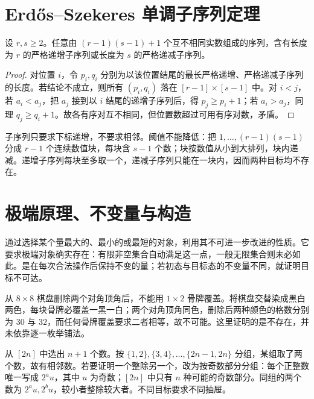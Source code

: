\documentclass[UTF8,12pt,a4paper,fontset=fandol]{ctexbook}
\begin{document}
\section{Erd\H{o}s--Szekeres 单调子序列定理}

\begin{theorem}
设 $r,s\ge2$。任意由 $(r-1)(s-1)+1$ 个互不相同实数组成的序列，含有长度为 $r$ 的严格递增子序列或长度为 $s$ 的严格递减子序列。
\end{theorem}
\begin{proof}
对位置 $i$，令 $p_i,q_i$ 分别为以该位置结尾的最长严格递增、严格递减子序列的长度。若结论不成立，则所有 $(p_i,q_i)$ 落在 $[r-1]\times[s-1]$ 中。对 $i<j$，若 $a_i<a_j$，把 $a_j$ 接到以 $i$ 结尾的递增子序列后，得 $p_j\ge p_i+1$；若 $a_i>a_j$，同理 $q_j\ge q_i+1$。故各有序对互不相同，但位置数超过可用有序对数，矛盾。
\end{proof}

子序列只要求下标递增，不要求相邻。阈值不能降低：把 $1,\ldots,(r-1)(s-1)$ 分成 $r-1$ 个连续数值块，每块含 $s-1$ 个数；块按数值从小到大排列，块内递减。递增子序列每块至多取一个，递减子序列只能在一块内，因而两种目标均不存在。

\section{极端原理、不变量与构造}

通过选择某个量最大的、最小的或最短的对象，利用其不可进一步改进的性质。它要求极端对象确实存在：有限非空集合自动满足这一点，一般无限集合则未必如此。是在每次合法操作后保持不变的量；若初态与目标态的不变量不同，就证明目标不可达。

\begin{example}[棋盘染色]
从 $8\times8$ 棋盘删除两个对角顶角后，不能用 $1\times2$ 骨牌覆盖。将棋盘交替染成黑白两色，每块骨牌必覆盖一黑一白；两个对角顶角同色，删除后两种颜色的格数分别为 $30$ 与 $32$，而任何骨牌覆盖要求二者相等，故不可能。这里证明的是不存在，并未依靠逐一枚举铺法。
\end{example}

\begin{example}[同一集合的两种抽屉]
从 $[2n]$ 中选出 $n+1$ 个数。按 $\{1,2\},\{3,4\},\ldots,\{2n-1,2n\}$ 分组，某组取了两个数，故有相邻数。若要证明一个整除另一个，改为按奇数部分分组：每个正整数唯一写成 $2^a u$，其中 $u$ 为奇数；$[2n]$ 中只有 $n$ 种可能的奇数部分。同组的两个数为 $2^a u,2^b u$，较小者整除较大者。不同目标要求不同抽屉。
\end{example}
\end{document}

